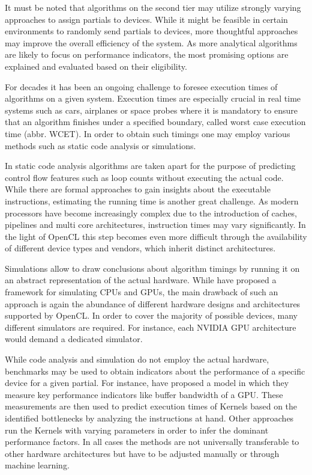 It must be noted that algorithms on the second tier may utilize strongly varying approaches to assign partials to devices. While it might be feasible in certain environments to randomly send partials to devices, more thoughtful approaches may improve the overall efficiency of the system. As more analytical algorithms are likely to focus on performance indicators, the most promising options are explained and evaluated based on their eligibility.

For decades it has been an ongoing challenge to foresee execution times of algorithms on a given system. Execution times are especially crucial in real time systems such as cars, airplanes or space probes where it is mandatory to ensure that an algorithm finishes under a specified boundary, called worst case execution time (abbr. WCET). In order to obtain such timings one may employ various methods such as static code analysis or simulations\cite{wcet}.

In static code analysis algorithms are taken apart for the purpose of predicting control flow features such as loop counts without executing the actual code\cite{loopbound}\cite{sweet}. While there are formal approaches to gain insights about the executable instructions, estimating the running time is another great challenge. As modern processors have become increasingly complex due to the introduction of caches, pipelines and multi core architectures, instruction times may vary significantly\cite{wcet}. In the light of OpenCL this step becomes even more difficult through the availability of different device types and vendors, which inherit distinct architectures.

Simulations allow to draw conclusions about algorithm timings by running it on an abstract representation of the actual hardware\cite{wcet}. While \citeauthor{multi2sim} have proposed a framework for simulating CPUs and GPUs\cite{multi2sim}, the main drawback of such an approach is again the abundance of different hardware designs and architectures supported by OpenCL. In order to cover the majority of possible devices, many different simulators are required. For instance, each NVIDIA GPU architecture would demand a dedicated simulator.

While code analysis and simulation do not employ the actual hardware, benchmarks may be used to obtain indicators about the performance of a specific device for a given partial. For instance, \citeauthor{quantitative_performance} have proposed a model in which they measure key performance indicators like buffer bandwidth of a GPU\cite{quantitative_performance}. These measurements are then used to predict execution times of Kernels based on the identified bottlenecks by analyzing the instructions at hand. Other approaches run the Kernels with varying parameters in order to infer the dominant performance factors\cite{gpgpu_performance}. In all cases the methods are not universally transferable to other hardware architectures but have to be adjusted manually or through machine learning.

